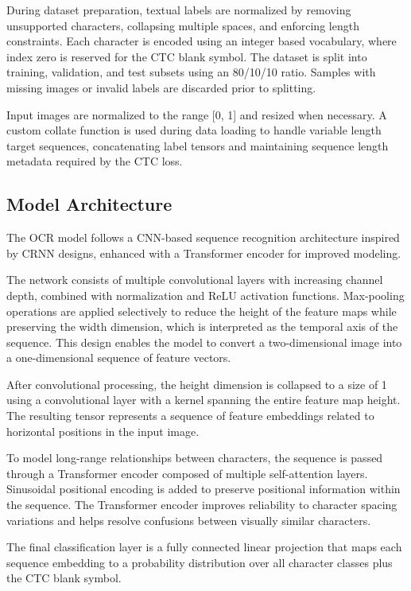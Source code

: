 \documentclass[conference]{IEEEtran}
\begin{document}
During dataset preparation, textual labels are normalized by removing unsupported characters, collapsing multiple spaces, and enforcing length constraints. Each character is encoded using an integer based vocabulary, where index zero is reserved for the CTC blank symbol. The dataset is split into training, validation, and test subsets using an 80/10/10 ratio. Samples with missing images or invalid labels are discarded prior to splitting.

Input images are normalized to the range [0, 1] and resized when necessary. A custom collate function is used during data loading to handle variable length target sequences, concatenating label tensors and maintaining sequence length metadata required by the CTC loss.

\subsection{Model Architecture}

The OCR model follows a CNN-based sequence recognition architecture inspired by CRNN designs, enhanced with a Transformer encoder for improved modeling.

The network consists of multiple convolutional layers with increasing channel depth, combined with normalization and ReLU activation functions. Max-pooling operations are applied selectively to reduce the height of the feature maps while preserving the width dimension, which is interpreted as the temporal axis of the sequence. This design enables the model to convert a two-dimensional image into a one-dimensional sequence of feature vectors.

After convolutional processing, the height dimension is collapsed to a size of 1 using a convolutional layer with a kernel spanning the entire feature map height. The resulting tensor represents a sequence of feature embeddings related to horizontal positions in the input image.

To model long-range relationships between characters, the sequence is passed through a Transformer encoder composed of multiple self-attention layers. Sinusoidal positional encoding is added to preserve positional information within the sequence. The Transformer encoder improves reliability to character spacing variations and helps resolve confusions between visually similar characters.

The final classification layer is a fully connected linear projection that maps each sequence embedding to a probability distribution over all character classes plus the CTC blank symbol.
\end{document}
